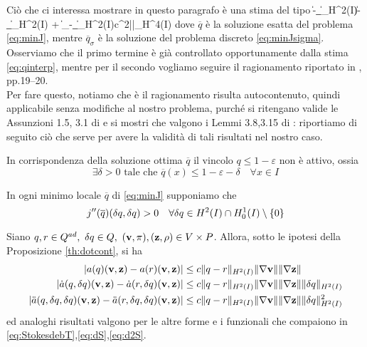 Ciò che ci interessa mostrare in questo paragrafo è una stima del tipo
\beq
	\|-_\sigma\|_{H^2(I)}\leq\|-\Pi_\sigma{}\|_{H^2(I)} + \|\Pi_\sigma{}-_\sigma\|_{H^2(I)}\leq c\sigma^2||_{H^4(I)}
\label{eq:stimaerrq}
\eeq
dove $\overline{q}$ è la soluzione esatta del problema \eqref{eq:minJ}, mentre $\overline{q}_\sigma$ è la soluzione del problema discreto \eqref{eq:minJsigma}.\\
Osserviamo che il primo termine è già controllato opportunamente dalla stima \eqref{eq:qinterp}, mentre per il secondo vogliamo seguire il ragionamento riportato in \cite{Kinigera}, pp.19--20.\\
Per fare questo, notiamo che è il ragionamento risulta autocontenuto, quindi applicabile senza modifiche al nostro problema, purché si ritengano valide le Assunzioni 1.5, 3.1 di \cite{Kinigera} e si mostri che valgono i Lemmi 3.8,3.15 di \cite{Kinigera}: riportiamo di seguito ciò che serve per avere la validità di tali risultati nel nostro caso.
\begin{assunzione}
	In corrispondenza della soluzione ottima $\overline{q}$ il vincolo $q\leq1-\varepsilon$ non è attivo, ossia
	$$ \exists\delta>0\text{ tale che }\overline{q}(x)\leq1-\varepsilon-\delta\quad\forall x\in I$$
\label{ass:noeps}
\end{assunzione}
\begin{assunzione}
	In ogni minimo locale $\overline{q}$ di \eqref{eq:minJ} supponiamo che
	$$j''(\overline{q})({\delta q},{\delta q})>0\quad\forall{\delta q}\in H^2(I)\cap H^1_0(I)\setminus\{0\}$$
\label{ass:jpos}
\end{assunzione}
\begin{prop}
	Siano $q,r\in\Q,\ \dq\in Q,\ (\v,\pi),(\z,\rho)\in V\times P$.
	Allora, sotto le ipotesi della Proposizione \ref{th:dotcont}, si ha
	\begin{equation*}\begin{split}
	|a(q)(\mathbf{v},\mathbf{z})-a(r)(\mathbf{v},\mathbf{z})|&\leq c\|q-r\|_{H^2(I)}\|\nabla\mathbf{v}\|\|\nabla\mathbf{z}\|\\
	|\dot{a}(q,{\delta q})(\mathbf{v},\mathbf{z})-\dot{a}(r,{\delta q})(\mathbf{v},\mathbf{z})|&\leq c\|q-r\|_{H^2(I)}\|\nabla\mathbf{v}\|\|\nabla\mathbf{z}\|\|{\delta q}\|_{H^2(I)}\\
	|\ddot{a}(q,{\delta q},{\delta q})(\mathbf{v},\mathbf{z})-\ddot{a}(r,{\delta q},{\delta q})(\mathbf{v},\mathbf{z})|&\leq c\|q-r\|_{H^2(I)}\|\nabla\mathbf{v}\|\|\nabla\mathbf{z}\|\|{\delta q}\|_{H^2(I)}^2\\
	\end{split}\end{equation*}
	ed analoghi risultati valgono per le altre forme e i funzionali che compaiono in \eqref{eq:StokesdebT},\eqref{eq:dS},\eqref{eq:d2S}.
\label{th:q-r}
\end{prop}
